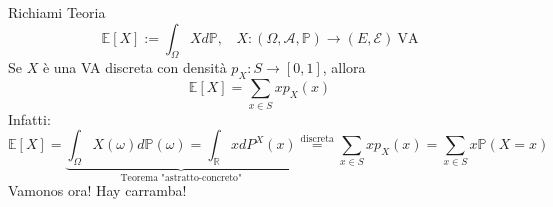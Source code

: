 Richiami Teoria
\begin{equation*}
\mathbb{E}[ X] :=\int _{\Omega } Xd\mathbb{P} ,\ \ \ \ X:( \Omega ,\mathcal{A} ,\mathbb{P})\rightarrow ( E,\mathcal{E}) \ \text{VA}
\end{equation*}
Se $X$ è una VA discreta con densità $p_{X} :S\rightarrow [ 0,1]$, allora
\begin{equation*}
\mathbb{E}[ X] =\sum\limits _{x\in S} xp_{X}( x)
\end{equation*}
Infatti:
\begin{equation*}
\mathbb{E}[ X] =\underbrace{\int _{\Omega } X( \omega ) d\mathbb{P}( \omega ) =\int _{\mathbb{R}} xdP^{X}( x)}_{\text{Teorema "astratto-concreto"}}\overset{\text{discreta}}{=}\sum\limits _{x\in S} xp_{X}( x) =\sum\limits _{x\in S} x\mathbb{P}( X=x)
\end{equation*}
Vamonos ora! Hay carramba!
